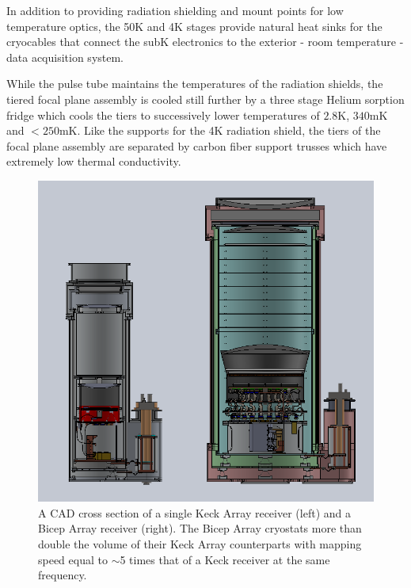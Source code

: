 \documentclass[]{spie}  %
\begin{document}
In addition to providing radiation shielding and mount points for low
temperature optics, the 50K and 4K stages provide natural heat sinks for the
cryocables that connect the subK electronics to the exterior - room
temperature - data acquisition system.



While the pulse tube maintains the temperatures of the radiation
shields, the tiered focal plane assembly is cooled still further by a three stage Helium sorption
fridge which cools the tiers to successively lower temperatures of $2.8$K,
$340$mK and $<250$mK. Like the supports for the 4K radiation shield, the tiers
of the focal plane assembly are separated by carbon fiber support trusses
which have extremely low thermal conductivity.



\begin{figure} [ht]
	\begin{center}
		\includegraphics[scale=0.4]{BA_keck_comp.png}
	\end{center}
	\caption{A CAD cross section of a single Keck Array receiver (left) and a
	Bicep Array receiver (right). The Bicep Array cryostats more than double
	the volume of their Keck Array counterparts with mapping speed equal to
	$\sim$5 times that of a Keck receiver at the same frequency.}
	\label{fig:bavskeck}
\end{figure}
\end{document}

